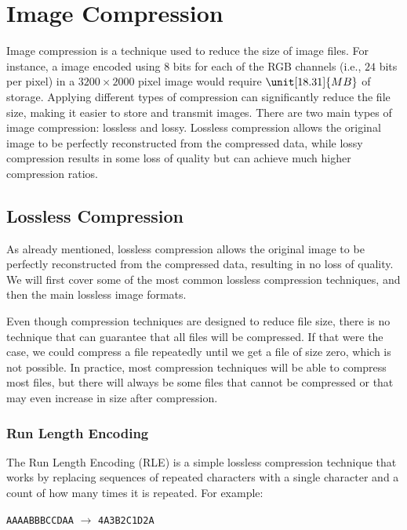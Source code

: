 \chapter{Image Compression}

Image compression is a technique used to reduce the size of image files. For instance, a image encoded using $8$ bits for each of the RGB channels (i.e., $24$ bits per pixel) in a $3200\times 2000$ pixel image would require $\unit[18.31]{MB}$ of storage. Applying different types of compression can significantly reduce the file size, making it easier to store and transmit images. There are two main types of image compression: lossless and lossy. Lossless compression allows the original image to be perfectly reconstructed from the compressed data, while lossy compression results in some loss of quality but can achieve much higher compression ratios.

\section{Lossless Compression}

As already mentioned, lossless compression allows the original image to be perfectly reconstructed from the compressed data, resulting in no loss of quality. We will first cover some of the most common lossless compression techniques, and then the main lossless image formats.
\begin{observacion}
    Even though compression techniques are designed to reduce file size, there is no technique that can guarantee that all files will be compressed. If that were the case, we could compress a file repeatedly until we get a file of size zero, which is not possible. In practice, most compression techniques will be able to compress most files, but there will always be some files that cannot be compressed or that may even increase in size after compression.
\end{observacion}

\subsection{Run Length Encoding}

The Run Length Encoding (RLE) is a simple lossless compression technique that works by replacing sequences of repeated characters with a single character and a count of how many times it is repeated. For example:
\begin{center}
    \texttt{AAAABBBCCDAA} $\rightarrow$ \texttt{4A3B2C1D2A}
\end{center}

